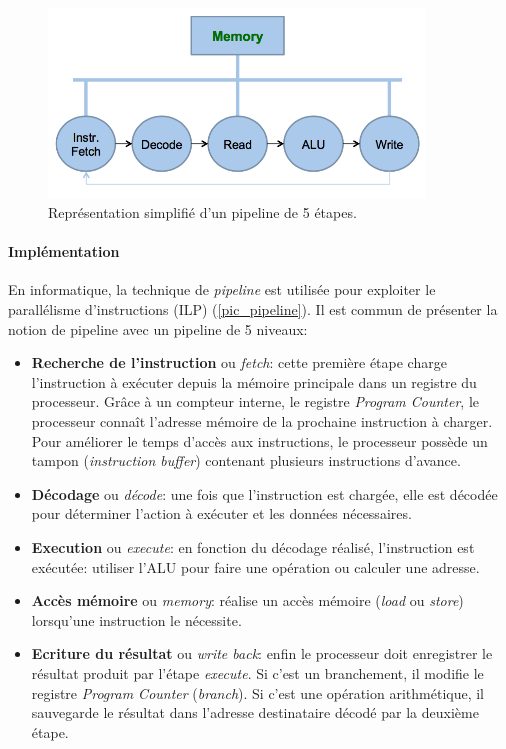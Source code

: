 \begin{figure}
    \center
    \includegraphics[width=10cm]{images/Chapitre1/Neumann.png}
    \caption{\label{pic_pipeline_simple} Représentation simplifié d'un pipeline de 5 étapes.}
\end{figure}


\paragraph{Implémentation}

En informatique, la technique de \textit{pipeline} est utilisée pour exploiter le parallélisme d'instructions (ILP) (\autoref{pic_pipeline}). Il est commun de présenter la notion de pipeline avec un pipeline de 5 niveaux:

\begin{itemize}
    \item \textbf{Recherche de l'instruction} ou \textit{fetch}: cette première étape charge l'instruction à exécuter depuis la mémoire principale dans un registre du processeur. Grâce à un compteur interne, le registre \textit{Program Counter}, le processeur connaît l'adresse mémoire de la prochaine instruction à charger. Pour améliorer le temps d'accès aux instructions, le processeur possède un tampon (\textit{instruction buffer}) contenant plusieurs instructions d'avance.
    \item \textbf{Décodage} ou \textit{décode}: une fois que l'instruction est chargée, elle est décodée pour déterminer l'action à exécuter et les données nécessaires.
    \item \textbf{Execution} ou \textit{execute}: en fonction du décodage réalisé, l'instruction est exécutée: utiliser l'ALU pour faire une opération ou calculer une adresse.
    \item \textbf{Accès mémoire} ou \textit{memory}: réalise un accès mémoire (\textit{load} ou \textit{store}) lorsqu'une instruction le nécessite.
    \item \textbf{Ecriture du résultat} ou \textit{write back}: enfin le processeur doit enregistrer le résultat produit par l'étape \textit{execute}. Si c'est un branchement, il modifie le registre \textit{Program Counter} (\textit{branch}). Si c'est une opération arithmétique, il sauvegarde le résultat dans l'adresse destinataire décodé par la deuxième étape.
\end{itemize}

